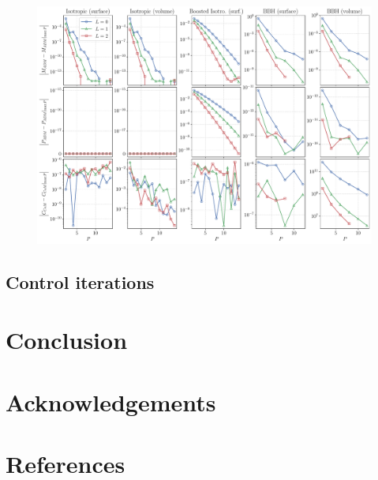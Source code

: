 \documentclass{../document}
\begin{document}
      \begin{figure}
        \centering
        \includegraphics[width=\textwidth]{../../plots/final_report/resolution_convergence.pdf}
        \caption{}
      \end{figure}

    \subsection{Control iterations}


  \section{Conclusion}

  \section*{Acknowledgements}

  \section*{References}

	  \printbibliography[heading=none]
  
\end{document}
